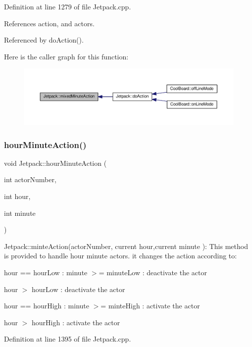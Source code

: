 Definition at line 1279 of file Jetpack.\+cpp.



References action, and actors.



Referenced by do\+Action().

Here is the caller graph for this function\+:
\nopagebreak
\begin{figure}[H]
\begin{center}
\leavevmode
\includegraphics[width=350pt]{df/d1d/class_jetpack_acf8ed1fb594b9e8e224f4ed872a8e093_icgraph}
\end{center}
\end{figure}
\mbox{\label{class_jetpack_ae01c13c785ebdf1b0bb5500234aba1bd}} 
\subsubsection{\texorpdfstring{hour\+Minute\+Action()}{hourMinuteAction()}}
{\footnotesize\ttfamily void Jetpack\+::hour\+Minute\+Action (\begin{DoxyParamCaption}\item[{int}]{actor\+Number,  }\item[{int}]{hour,  }\item[{int}]{minute }\end{DoxyParamCaption})}

Jetpack\+::minte\+Action(actor\+Number, current hour,current minute )\+: This method is provided to handle hour minute actors. it changes the action according to\+:

hour == hour\+Low \+: minute $>$= minute\+Low \+: deactivate the actor

hour $>$ hour\+Low \+: deactivate the actor

hour == hour\+High \+: minute $>$= minte\+High \+: activate the actor

hour $>$ hour\+High \+: activate the actor 

Definition at line 1395 of file Jetpack.\+cpp.



